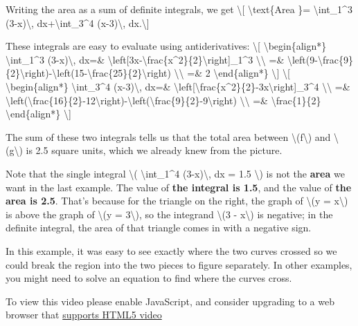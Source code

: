 Writing the area as a sum of definite integrals, we get
\textbackslash{}{[} \textbackslash{}text\{Area \}=
\textbackslash{}int\_1\^{}3 (3-x)\textbackslash{},
dx+\textbackslash{}int\_3\^{}4 (x-3)\textbackslash{},
dx.\textbackslash{}{]}

These integrals are easy to evaluate using antiderivatives:
\textbackslash{}{[} \textbackslash{}begin\{align*\}
\textbackslash{}int\_1\^{}3 (3-x)\textbackslash{}, dx=\&
\textbackslash{}left{[}3x-\textbackslash{}frac\{x\^{}2\}\{2\}\textbackslash{}right{]}\_1\^{}3
\textbackslash{}\textbackslash{} =\&
\textbackslash{}left(9-\textbackslash{}frac\{9\}\{2\}\textbackslash{}right)-\textbackslash{}left(15-\textbackslash{}frac\{25\}\{2\}\textbackslash{}right)
\textbackslash{}\textbackslash{} =\& 2 \textbackslash{}end\{align*\}
\textbackslash{}{]} \textbackslash{}{[} \textbackslash{}begin\{align*\}
\textbackslash{}int\_3\^{}4 (x-3)\textbackslash{}, dx=\&
\textbackslash{}left{[}\textbackslash{}frac\{x\^{}2\}\{2\}-3x\textbackslash{}right{]}\_3\^{}4
\textbackslash{}\textbackslash{} =\&
\textbackslash{}left(\textbackslash{}frac\{16\}\{2\}-12\textbackslash{}right)-\textbackslash{}left(\textbackslash{}frac\{9\}\{2\}-9\textbackslash{}right)
\textbackslash{}\textbackslash{} =\& \textbackslash{}frac\{1\}\{2\}
\textbackslash{}end\{align*\} \textbackslash{}{]}

The sum of these two integrals tells us that the total area between
\textbackslash{}(f\textbackslash{}) and
\textbackslash{}(g\textbackslash{}) is 2.5 square units, which we
already knew from the picture.

Note that the single integral \textbackslash{}(
\textbackslash{}int\_1\^{}4 (3-x)\textbackslash{}, dx = 1.5
\textbackslash{}) is not the \textbf{area} we want in the last example.
The value of \textbf{the integral is 1.5}, and the value of \textbf{the
area is 2.5}. That's because for the triangle on the right, the graph of
\textbackslash{}(y = x\textbackslash{}) is above the graph of
\textbackslash{}(y = 3\textbackslash{}), so the integrand
\textbackslash{}(3 - x\textbackslash{}) is negative; in the definite
integral, the area of that triangle comes in with a negative sign.

In this example, it was easy to see exactly where the two curves crossed
so we could break the region into the two pieces to figure separately.
In other examples, you might need to solve an equation to find where the
curves cross.

To view this video please enable JavaScript, and consider upgrading to a
web browser that \href{http://videojs.com/html5-video-support/}{supports
HTML5 video}

